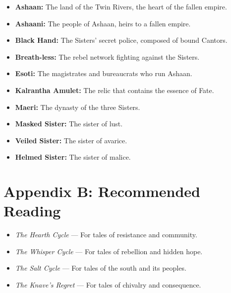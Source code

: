 \documentclass[11pt,twoside]{book}
\begin{document}
\begin{itemize}
    \item \textbf{Ashaan:} The land of the Twin Rivers, the heart of the fallen empire.
    \item \textbf{Ashaani:} The people of Ashaan, heirs to a fallen empire.
    \item \textbf{Black Hand:} The Sisters' secret police, composed of bound Cantors.
    \item \textbf{Breath-less:} The rebel network fighting against the Sisters.
    \item \textbf{Esoti:} The magistrates and bureaucrats who run Ashaan.
    \item \textbf{Kalrantha Amulet:} The relic that contains the essence of Fate.
    \item \textbf{Maeri:} The dynasty of the three Sisters.
    \item \textbf{Masked Sister:} The sister of lust.
    \item \textbf{Veiled Sister:} The sister of avarice.
    \item \textbf{Helmed Sister:} The sister of malice.
\end{itemize}

\chapter*{Appendix B: Recommended Reading}

\begin{itemize}
    \item \textit{The Hearth Cycle} --- For tales of resistance and community.
    \item \textit{The Whisper Cycle} --- For tales of rebellion and hidden hope.
    \item \textit{The Salt Cycle} --- For tales of the south and its peoples.
    \item \textit{The Knave's Regret} --- For tales of chivalry and consequence.
\end{itemize}
\end{document}
